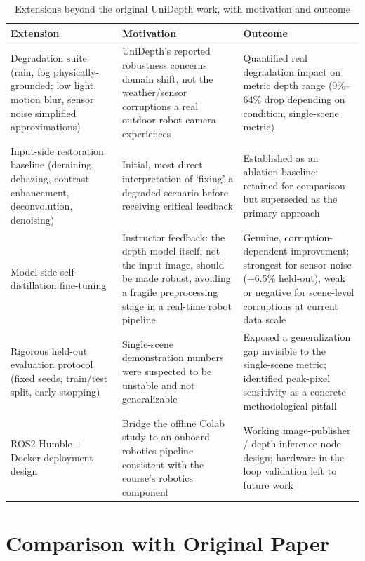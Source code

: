 \documentclass[conference]{IEEEtran}
\begin{document}
\begin{table}[!t]
\caption{Extensions beyond the original UniDepth work, with motivation and outcome}
\label{tab:extensions}
\centering
\begin{tabular}{p{3.2cm}p{5cm}p{5cm}}
\toprule
\textbf{Extension} & \textbf{Motivation} & \textbf{Outcome} \\
\midrule
Degradation suite (rain, fog physically-grounded; low light, motion blur, sensor noise simplified approximations) & UniDepth's reported robustness concerns domain shift, not the weather/sensor corruptions a real outdoor robot camera experiences & Quantified real degradation impact on metric depth range (9\%--64\% drop depending on condition, single-scene metric) \\
\addlinespace
Input-side restoration baseline (deraining, dehazing, contrast enhancement, deconvolution, denoising) & Initial, most direct interpretation of `fixing' a degraded scenario before receiving critical feedback & Established as an ablation baseline; retained for comparison but superseded as the primary approach \\
\addlinespace
Model-side self-distillation fine-tuning & Instructor feedback: the depth model itself, not the input image, should be made robust, avoiding a fragile preprocessing stage in a real-time robot pipeline & Genuine, corruption-dependent improvement; strongest for sensor noise (+6.5\% held-out), weak or negative for scene-level corruptions at current data scale \\
\addlinespace
Rigorous held-out evaluation protocol (fixed seeds, train/test split, early stopping) & Single-scene demonstration numbers were suspected to be unstable and not generalizable & Exposed a generalization gap invisible to the single-scene metric; identified peak-pixel sensitivity as a concrete methodological pitfall \\
\addlinespace
ROS2 Humble + Docker deployment design & Bridge the offline Colab study to an onboard robotics pipeline consistent with the course's robotics component & Working image-publisher / depth-inference node design; hardware-in-the-loop validation left to future work \\
\bottomrule
\end{tabular}
\end{table}

\section{Comparison with Original Paper}
\end{document}
